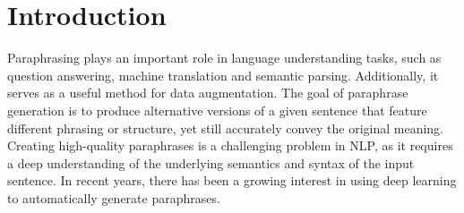 \documentclass[fleqn,moreauthors,10pt]{ds_report}
\affiliation{\textit{Advisers: Slavko Žitnik}}
\begin{document}
\flushbottom

\maketitle

\thispagestyle{empty}


\section*{Introduction}

Paraphrasing plays an important role in language understanding tasks, such as question answering, machine translation and semantic parsing. Additionally, it serves as a useful method for data augmentation. The goal of paraphrase generation is to produce alternative versions of a given sentence that feature different phrasing or structure, yet still accurately convey the original meaning. Creating high-quality paraphrases is a challenging problem in NLP, as it requires a deep understanding of the underlying semantics and syntax of the input sentence. In recent years, there has been a growing interest in using deep learning to automatically generate paraphrases.
\end{document}
